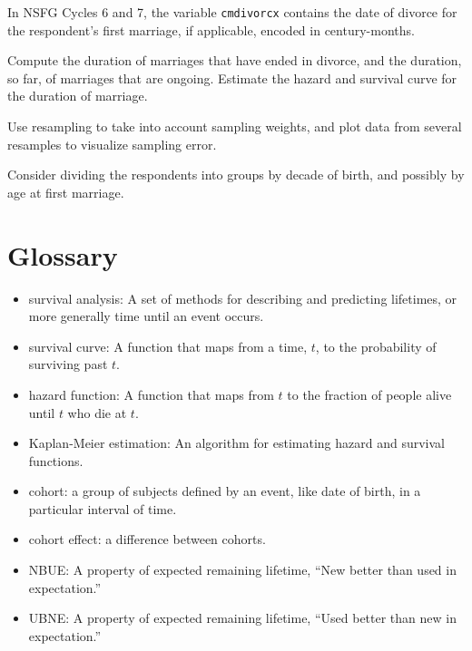 \documentclass[12pt]{book}
\begin{document}
\begin{exercise}
In NSFG Cycles 6 and 7, the variable {\tt cmdivorcx} contains the
date of divorce for the respondent's first marriage, if applicable,
encoded in century-months.

Compute the duration of marriages that have ended in divorce, and
the duration, so far, of marriages that are ongoing.  Estimate the
hazard and survival curve for the duration of marriage.

Use resampling to take into account sampling weights, and plot
data from several resamples to visualize sampling error.

Consider dividing the respondents into groups by decade of birth,
and possibly by age at first marriage.

\end{exercise}


\section{Glossary}

\begin{itemize}

\item survival analysis: A set of methods for describing and
  predicting lifetimes, or more generally time until an event occurs.

\item survival curve: A function that maps from a time, $t$, to the
  probability of surviving past $t$.

\item hazard function: A function that maps from $t$ to the fraction
of people alive until $t$ who die at $t$.

\item Kaplan-Meier estimation: An algorithm for estimating hazard and
survival functions.

\item cohort: a group of subjects defined by an event, like date of
birth, in a particular interval of time.

\item cohort effect: a difference between cohorts.

\item NBUE: A property of expected remaining lifetime, ``New
better than used in expectation.''

\item UBNE: A property of expected remaining lifetime, ``Used
better than new in expectation.''

\end{itemize}
\end{document}
